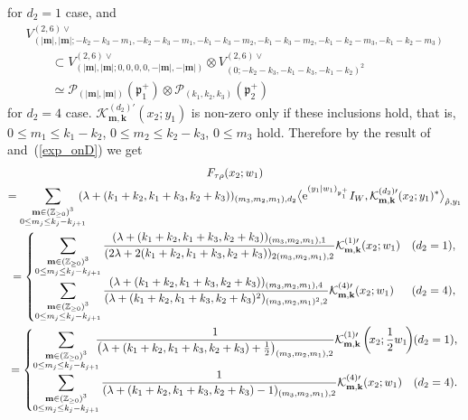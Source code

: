\documentclass[pdftex]{sigma}
\numberwithin{equation}{section}
\newcommand{\ds}{\displaystyle}
\newcommand{\bk}{\mathbf{k}}
\newcommand{\bm}{\mathbf{m}}
\newcommand{\BZ}{\mathbb{Z}}
\newcommand{\fp}{\mathfrak{p}}
\newcommand{\cK}{\mathcal{K}}
\newcommand{\cP}{\mathcal{P}}
\begin{document}
for $d_2=1$ case, and
\begin{gather*}
 V_{(|\bm|,|\bm|;-k_2-k_3-m_1,-k_2-k_3-m_1,-k_1-k_3-m_2,-k_1-k_3-m_2,-k_1-k_2-m_3,-k_1-k_2-m_3)}^{(2,6)\vee}\\
\qquad{} \subset V_{(|\bm|,|\bm|;0,0,0,0,-|\bm|,-|\bm|)}^{(2,6)\vee}\otimes V_{(0;-k_2-k_3,-k_1-k_3,-k_1-k_2)^2}^{(2,6)\vee}\\
\qquad{} \simeq \cP_{(|\bm|,|\bm|)}(\fp^+_1)\otimes\cP_{(k_1,k_2,k_3)}(\fp^+_2)
\end{gather*}
for $d_2=4$ case. $\cK_{\bm,\bk}^{(d_2)\prime}(x_2;y_1)$ is non-zero only if these inclusions hold, that is,
$0\le m_1\le k_1-k_2$, $0\le m_2\le k_2-k_3$, $0\le m_3$ hold.
Therefore by the result of~\cite{N2} and~(\ref{exp_onD}) we get
\begin{gather*}
 F_{\tau\rho}(x_2;w_1)\\
 = \sum_{\substack{\bm\in(\BZ_{\ge 0})^3\\ 0\le m_j\le k_j-k_{j+1}}} \!\!\!\!
(\lambda+(k_1+k_2,k_1+k_3,k_2+k_3))_{(m_3,m_2,m_1),d_2}
\big\langle {\rm e}^{(y_1|w_1)_{\fp^+_1}}I_W,\cK_{\bm,\bk}^{(d_2)\prime}(x_2;y_1)^*\big\rangle_{\hat{\rho},y_1}\\
 =\begin{cases}\ds \sum_{\substack{\bm\in(\BZ_{\ge 0})^3\\ 0\le m_j\le k_j-k_{j+1}}}\frac{(\lambda+(k_1+k_2,k_1+k_3,k_2+k_3))_{(m_3,m_2,m_1),1}}
{(2\lambda+2(k_1+k_2,k_1+k_3,k_2+k_3))_{2(m_3,m_2,m_1),2}}\cK_{\bm,\bk}^{(1)\prime}(x_2;w_1) & (d_2=1), \\
\ds \sum_{\substack{\bm\in(\BZ_{\ge 0})^3\\ 0\le m_j\le k_j-k_{j+1}}}\frac{(\lambda+(k_1+k_2,k_1+k_3,k_2+k_3))_{(m_3,m_2,m_1),4}}
{(\lambda+(k_1+k_2,k_1+k_3,k_2+k_3)^2)_{(m_3,m_2,m_1)^2,2}}\cK_{\bm,\bk}^{(4)\prime}(x_2;w_1) & (d_2=4), \end{cases}\\
 =\begin{cases}\ds \sum_{\substack{\bm\in(\BZ_{\ge 0})^3\\ 0\le m_j\le k_j-k_{j+1}}}\!\!\!
\frac{1}{\left(\lambda+(k_1+k_2,k_1+k_3,k_2+k_3)+\frac{1}{2}\right)_{(m_3,m_2,m_1),2}}
\cK_{\bm,\bk}^{(1)\prime}\left(\!x_2;\frac{1}{2}w_1\!\right) \hspace{-18pt}& (d_2=1), \\
\ds \sum_{\substack{\bm\in(\BZ_{\ge 0})^3\\ 0\le m_j\le k_j-k_{j+1}}}
\frac{1}{(\lambda+(k_1+k_2,k_1+k_3,k_2+k_3)-1)_{(m_3,m_2,m_1),2}}\cK_{\bm,\bk}^{(4)\prime}(x_2;w_1) & (d_2=4). \end{cases}
\end{gather*}
\end{document}
